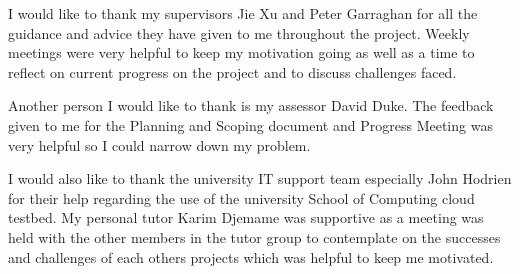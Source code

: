 I would like to thank my supervisors Jie Xu and Peter Garraghan for all the guidance and advice they have given to me throughout the project. Weekly meetings were very helpful to keep my motivation going as well as a time to reflect on current progress on the project and to discuss challenges faced.
\newline
\par
Another person I would like to thank is my assessor David Duke. The feedback given to me for the Planning and Scoping document and Progress Meeting was very helpful so I could narrow down my problem.
\newline
\par
I would also like to thank the university IT support team especially John Hodrien for their help regarding the use of the university School of Computing cloud testbed. My personal tutor Karim Djemame was supportive as a meeting was held with the other members in the tutor group to contemplate on the successes and challenges of each others projects which was helpful to keep me motivated.